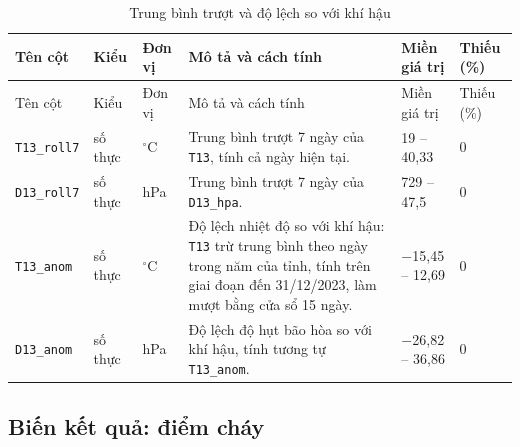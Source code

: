 \documentclass[12pt,a4paper]{article}
\begin{document}
\begin{longtable}{@{}>{\raggedright\arraybackslash}p{2.6cm}>{\raggedright\arraybackslash}p{1.35cm}>{\raggedright\arraybackslash}p{1.1cm}>{\raggedright\arraybackslash}p{5.1cm}>{\raggedright\arraybackslash}p{2.0cm}>{\raggedright\arraybackslash}p{1.0cm}@{}}
\caption{Trung bình trượt và độ lệch so với khí hậu}\label{tab:rolling}\\
\toprule
Tên cột & Kiểu & Đơn vị & Mô tả và cách tính & Miền giá trị & Thiếu (\%) \\
\midrule
\endfirsthead
\toprule
Tên cột & Kiểu & Đơn vị & Mô tả và cách tính & Miền giá trị & Thiếu (\%) \\
\midrule
\endhead
\bottomrule
\endfoot
\texttt{T13\_\allowbreak roll7} & số thực & $^\circ$C & Trung bình trượt 7 ngày của \texttt{T13}, tính cả ngày hiện tại. & 7{,}19 -- 40{,}33 & 0{,}0 \\
\texttt{D13\_\allowbreak roll7} & số thực & hPa & Trung bình trượt 7 ngày của \texttt{D13\_hpa}. & 0{,}729 -- 47{,}5 & 0{,}0 \\
\texttt{T13\_\allowbreak anom} & số thực & $^\circ$C & Độ lệch nhiệt độ so với khí hậu: \texttt{T13} trừ trung bình theo ngày trong năm của tỉnh, tính trên giai đoạn đến 31/12/2023, làm mượt bằng cửa sổ 15 ngày. & $-$15{,}45 -- 12{,}69 & 0{,}0 \\
\texttt{D13\_\allowbreak anom} & số thực & hPa & Độ lệch độ hụt bão hòa so với khí hậu, tính tương tự \texttt{T13\_anom}. & $-$26{,}82 -- 36{,}86 & 0{,}0 \\
\end{longtable}

\subsection{Biến kết quả: điểm cháy}
\end{document}
